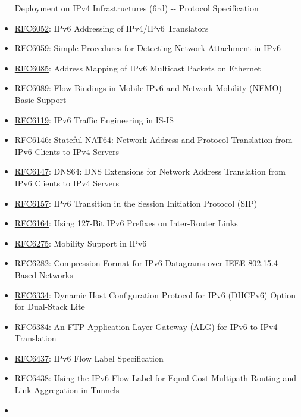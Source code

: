 \documentclass[
]{article}
\begin{document}
\begin{itemize}
  Deployment on IPv4 Infrastructures (6rd) -\/- Protocol Specification
\item
  \href{https://www.rfc-editor.org/info/rfc6052}{RFC6052}: IPv6
  Addressing of IPv4/IPv6 Translators
\item
  \href{https://www.rfc-editor.org/info/rfc6059}{RFC6059}: Simple
  Procedures for Detecting Network Attachment in IPv6
\item
  \href{https://www.rfc-editor.org/info/rfc6085}{RFC6085}: Address
  Mapping of IPv6 Multicast Packets on Ethernet
\item
  \href{https://www.rfc-editor.org/info/rfc6089}{RFC6089}: Flow Bindings
  in Mobile IPv6 and Network Mobility (NEMO) Basic Support
\item
  \href{https://www.rfc-editor.org/info/rfc6119}{RFC6119}: IPv6 Traffic
  Engineering in IS-IS
\item
  \href{https://www.rfc-editor.org/info/rfc6146}{RFC6146}: Stateful
  NAT64: Network Address and Protocol Translation from IPv6 Clients to
  IPv4 Servers
\item
  \href{https://www.rfc-editor.org/info/rfc6147}{RFC6147}: DNS64: DNS
  Extensions for Network Address Translation from IPv6 Clients to IPv4
  Servers
\item
  \href{https://www.rfc-editor.org/info/rfc6157}{RFC6157}: IPv6
  Transition in the Session Initiation Protocol (SIP)
\item
  \href{https://www.rfc-editor.org/info/rfc6164}{RFC6164}: Using 127-Bit
  IPv6 Prefixes on Inter-Router Links
\item
  \href{https://www.rfc-editor.org/info/rfc6275}{RFC6275}: Mobility
  Support in IPv6
\item
  \href{https://www.rfc-editor.org/info/rfc6282}{RFC6282}: Compression
  Format for IPv6 Datagrams over IEEE 802.15.4-Based Networks
\item
  \href{https://www.rfc-editor.org/info/rfc6334}{RFC6334}: Dynamic Host
  Configuration Protocol for IPv6 (DHCPv6) Option for Dual-Stack Lite
\item
  \href{https://www.rfc-editor.org/info/rfc6384}{RFC6384}: An FTP
  Application Layer Gateway (ALG) for IPv6-to-IPv4 Translation
\item
  \href{https://www.rfc-editor.org/info/rfc6437}{RFC6437}: IPv6 Flow
  Label Specification
\item
  \href{https://www.rfc-editor.org/info/rfc6438}{RFC6438}: Using the
  IPv6 Flow Label for Equal Cost Multipath Routing and Link Aggregation
  in Tunnels
\item

\end{itemize}
\end{document}
